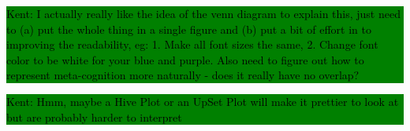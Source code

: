 \documentclass[hf]{ceurart}
\newcommand{\pinaforecomment}[4]{\colorbox{#1}{\textcolor{#4}{\parbox{.8\linewidth}{#2: #3}}}}
\newcommand{\osullikomment}[1]{\pinaforecomment{green}{Kent}{#1}{black}}
\begin{document}
\osullikomment{I actually really like the idea of the venn diagram to explain this, just need to (a) put the whole thing in a single figure and (b) put a bit of effort in to  improving the readability, eg: 1. Make all font sizes the same, 2. Change font color to be white for your blue and purple. Also need to figure out how to represent meta-cognition more naturally - does it really have no overlap?}

\osullikomment{Hmm, maybe a Hive Plot or an UpSet Plot will make it prettier to look at but are probably harder to interpret}

\def\firstcircle{(-1.5,1.5) circle (3cm)}
\def\secondcircle{(1.5,1.5cm) circle (3cm)}
\def\thirdcircle{(1.5,-1.5cm) circle (3cm)}
\def\fourthcircle{(-1.5,-1.5cm) circle (3cm)}
\end{document}
